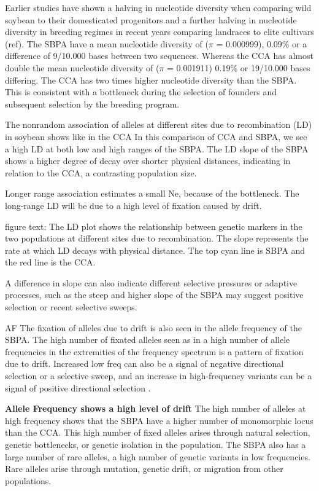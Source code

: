 \documentclass[9pt, onecolumn,twoside]{gsajnl}
\begin{document}
Earlier studies have shown a halving in nucleotide diversity when comparing wild soybean to their domesticated progenitors and a further halving in nucleotide diversity in breeding regimes in recent years comparing landraces to elite cultivars (ref). The SBPA have a mean nucleotide diversity of ($\pi$ = 0.000999), 0.09\% or a difference of  9/10.000 bases between two sequences. Whereas the CCA has almost double the mean nucleotide diversity of  ($\pi$ = 0.001911)  0.19\% or 19/10.000 bases differing.  The CCA has two times higher nucleotide diversity than the SBPA. This is consistent with a bottleneck during the selection of founders and subsequent selection by the breeding program.  

The nonrandom association of alleles at different sites due to recombination (LD) in soybean shows like in the CCA
In this comparison of CCA and SBPA, we see a high LD at both low and high ranges of the SBPA. The LD slope of the SBPA shows a higher degree of decay over shorter physical distances, indicating in relation to the CCA, a contrasting population size. 

Longer range association estimates a small Ne, because of the bottleneck. 
The long-range LD will be due to a high level of fixation caused by drift.   

figure text:  The LD plot shows the relationship between genetic markers in the two populations at different sites due to recombination. The slope represents the rate at which LD decays with physical distance. The top cyan line is SBPA and the red line is the CCA. 

A difference in slope can also indicate different selective pressures or adaptive processes, such as the steep and higher slope of the SBPA may suggest positive selection or recent selective sweeps. 

AF 
The fixation of alleles due to drift is also seen in the allele frequency of the SBPA. The high number of fixated alleles seen as 
in a high number of allele frequencies in the extremities of the frequency spectrum is a pattern of fixation due to drift. Increased low freq can also be a signal of negative directional selection or a selective sweep, and an increase in high-frequency variants can be a signal of positive directional selection \cite{}. 




\textbf{Allele Frequency shows a high level of drift}
The high number of alleles at high frequency shows that the SBPA have a higher number of monomorphic locus than the CCA. This high number of fixed alleles arises through natural selection, genetic bottlenecks, or genetic isolation in the population. The SBPA also has a large number of rare alleles, a high number of genetic variants in low frequencies. Rare alleles arise through mutation, genetic drift, or migration from other populations. 
\end{document}
